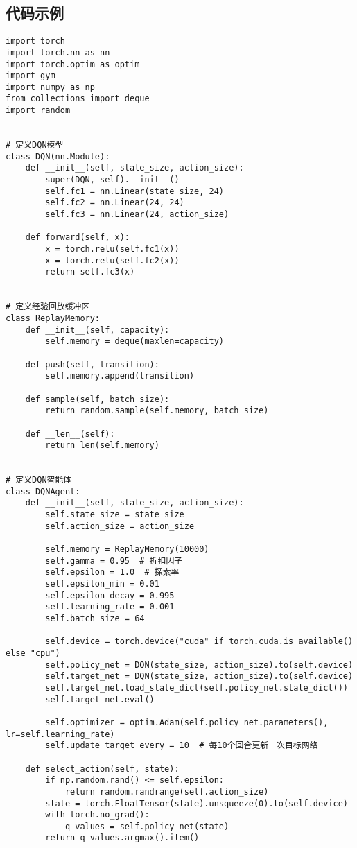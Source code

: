 \subsection*{代码示例}
\begin{lstlisting}
import torch
import torch.nn as nn
import torch.optim as optim
import gym
import numpy as np
from collections import deque
import random


# 定义DQN模型
class DQN(nn.Module):
    def __init__(self, state_size, action_size):
        super(DQN, self).__init__()
        self.fc1 = nn.Linear(state_size, 24)
        self.fc2 = nn.Linear(24, 24)
        self.fc3 = nn.Linear(24, action_size)

    def forward(self, x):
        x = torch.relu(self.fc1(x))
        x = torch.relu(self.fc2(x))
        return self.fc3(x)


# 定义经验回放缓冲区
class ReplayMemory:
    def __init__(self, capacity):
        self.memory = deque(maxlen=capacity)

    def push(self, transition):
        self.memory.append(transition)

    def sample(self, batch_size):
        return random.sample(self.memory, batch_size)

    def __len__(self):
        return len(self.memory)


# 定义DQN智能体
class DQNAgent:
    def __init__(self, state_size, action_size):
        self.state_size = state_size
        self.action_size = action_size

        self.memory = ReplayMemory(10000)
        self.gamma = 0.95  # 折扣因子
        self.epsilon = 1.0  # 探索率
        self.epsilon_min = 0.01
        self.epsilon_decay = 0.995
        self.learning_rate = 0.001
        self.batch_size = 64

        self.device = torch.device("cuda" if torch.cuda.is_available() else "cpu")
        self.policy_net = DQN(state_size, action_size).to(self.device)
        self.target_net = DQN(state_size, action_size).to(self.device)
        self.target_net.load_state_dict(self.policy_net.state_dict())
        self.target_net.eval()

        self.optimizer = optim.Adam(self.policy_net.parameters(), lr=self.learning_rate)
        self.update_target_every = 10  # 每10个回合更新一次目标网络

    def select_action(self, state):
        if np.random.rand() <= self.epsilon:
            return random.randrange(self.action_size)
        state = torch.FloatTensor(state).unsqueeze(0).to(self.device)
        with torch.no_grad():
            q_values = self.policy_net(state)
        return q_values.argmax().item()


\end{lstlisting}
